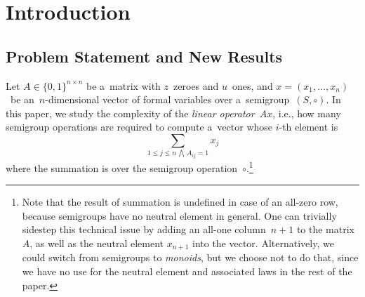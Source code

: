 \documentclass{toc}
\begin{document}
\begin{frontmatter}
\iffalse %

\tocarxivcategory{cs.CC}

\fi %

\end{frontmatter}


\section{Introduction}
\subsection{Problem Statement and New Results}

Let $A \in \{0,1\}^{n \times n}$ be a~matrix with $z$~zeroes and $u$~ones, and
$x=(x_1, \dotsc, x_n)$~be an~$n$-dimensional vector of formal variables over
a~semigroup~$(S, \circ)$. In this paper, we study the complexity of the
\emph{linear operator}~$Ax$, i.e., how many semigroup operations are required to
compute a~vector whose $i$-th element is
\begin{equation}\label{eq-problem-statement}
\sum_{1 \le j \le n\,\bigwedge\,A_{ij}=1}x_j
\end{equation}
where the summation is over the semigroup operation~$\circ$.\footnote{Note that
the result of summation is undefined in case of an all-zero row, because
semigroups have no neutral element in general. One can trivially sidestep this
technical issue by adding an all-one column~$n+1$ to the matrix~$A$, as well as
the neutral element $x_{n+1}$ into the vector. Alternatively, we could switch
from semigroups to \emph{monoids}, but we choose not to do that, since we have
no use for the neutral element and associated laws in the rest of the paper.}
\end{document}
